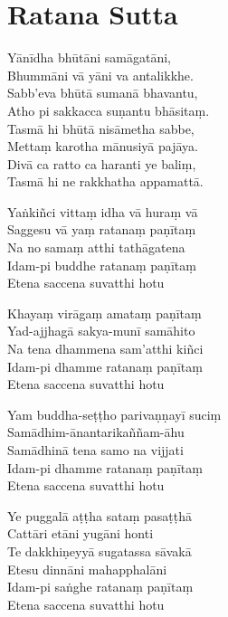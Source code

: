 \section{Ratana Sutta}


\begin{paritta}

Yānīdha bhūtāni samāgatāni,\\
Bhummāni vā yāni va antalikkhe.\\
Sabb'eva bhūtā sumanā bhavantu,\\
Atho pi sakkacca suṇantu bhāsitaṃ.\\
Tasmā hi bhūtā nisāmetha sabbe,\\
Mettaṃ karotha mānusiyā pajāya.\\
Divā ca ratto ca haranti ye baliṃ,\\
Tasmā hi ne rakkhatha appamattā.


%
Yaṅkiñci vittaṃ idha vā huraṃ vā\\
Saggesu vā yaṃ ratanaṃ paṇītaṃ\\
Na no samaṃ atthi tathāgatena\\
Idam-pi buddhe ratanaṃ paṇītaṃ\\
Etena saccena suvatthi hotu

\clearpage

%
Khayaṃ virāgaṃ amataṃ paṇītaṃ\\
Yad-ajjhagā sakya-munī samāhito\\
Na tena dhammena sam'atthi kiñci\\
Idam-pi dhamme ratanaṃ paṇītaṃ\\
Etena saccena suvatthi hotu

%
Yam buddha-seṭṭho parivaṇṇayī suciṃ\\
Samādhim-ānantarikaññam-āhu\\
Samādhinā tena samo na vijjati\\
Idam-pi dhamme ratanaṃ paṇītaṃ\\
Etena saccena suvatthi hotu

%
Ye puggalā aṭṭha sataṃ pasaṭṭhā\\
Cattāri etāni yugāni honti\\
Te dakkhiṇeyyā sugatassa sāvakā\\
Etesu dinnāni mahapphalāni\\
Idam-pi saṅghe ratanaṃ paṇītaṃ\\
Etena saccena suvatthi hotu


\end{paritta}
